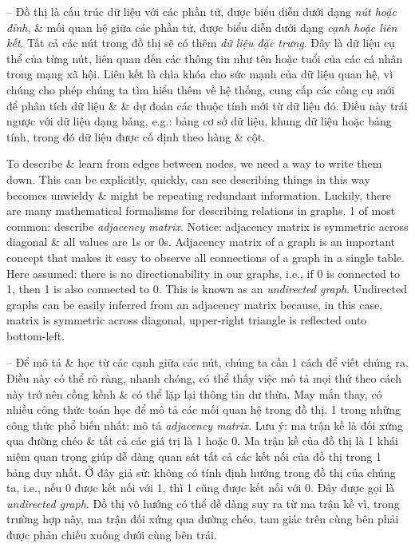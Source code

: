 \documentclass{article}
\begin{document}
\begin{itemize}
\begin{itemize}
\begin{itemize}
            -- Đồ thị là cấu trúc dữ liệu với các phần tử, được biểu diễn dưới dạng {\it nút hoặc đỉnh}, \& mối quan hệ giữa các phần tử, được biểu diễn dưới dạng {\it cạnh hoặc liên kết}. Tất cả các nút trong đồ thị sẽ có thêm {\it dữ liệu đặc trưng}. Đây là dữ liệu cụ thể của từng nút, liên quan đến các thông tin như tên hoặc tuổi của các cá nhân trong mạng xã hội. Liên kết là chìa khóa cho sức mạnh của dữ liệu quan hệ, vì chúng cho phép chúng ta tìm hiểu thêm về hệ thống, cung cấp các công cụ mới để phân tích dữ liệu \& \& dự đoán các thuộc tính mới từ dữ liệu đó. Điều này trái ngược với dữ liệu dạng bảng, e.g.: bảng cơ sở dữ liệu, khung dữ liệu hoặc bảng tính, trong đó dữ liệu được cố định theo hàng \& cột.

            To describe \& learn from edges between nodes, we need a way to write them down. This can be explicitly, quickly, can see describing things in this way becomes unwieldy \& might be repeating redundant information. Luckily, there are many mathematical formalisms for describing relations in graphs. 1 of most common: describe {\it adjacency matrix}. Notice: adjacency matrix is symmetric across diagonal \& all values are 1s or 0s. Adjacency matrix of a graph is an important concept that makes it easy to observe all connections of a graph in a single table. Here assumed: there is no directionability in our graphs, i.e., if 0 is connected to 1, then 1 is also connected to 0. This is known as an {\it undirected graph}. Undirected graphs can be easily inferred from an adjacency matrix because, in this case, matrix is symmetric across diagonal, upper-right triangle is reflected onto bottom-left.

            -- Để mô tả \& học từ các cạnh giữa các nút, chúng ta cần 1 cách để viết chúng ra. Điều này có thể rõ ràng, nhanh chóng, có thể thấy việc mô tả mọi thứ theo cách này trở nên cồng kềnh \& có thể lặp lại thông tin dư thừa. May mắn thay, có nhiều công thức toán học để mô tả các mối quan hệ trong đồ thị. 1 trong những công thức phổ biến nhất: mô tả {\it adjacency matrix}. Lưu ý: ma trận kề là đối xứng qua đường chéo \& tất cả các giá trị là 1 hoặc 0. Ma trận kề của đồ thị là 1 khái niệm quan trọng giúp dễ dàng quan sát tất cả các kết nối của đồ thị trong 1 bảng duy nhất. Ở đây giả sử: không có tính định hướng trong đồ thị của chúng ta, i.e., nếu 0 được kết nối với 1, thì 1 cũng được kết nối với 0. Đây được gọi là {\it undirected graph}. Đồ thị vô hướng có thể dễ dàng suy ra từ ma trận kề vì, trong trường hợp này, ma trận đối xứng qua đường chéo, tam giác trên cùng bên phải được phản chiếu xuống dưới cùng bên trái.


\end{itemize}
\end{itemize}
\end{itemize}
\end{document}
